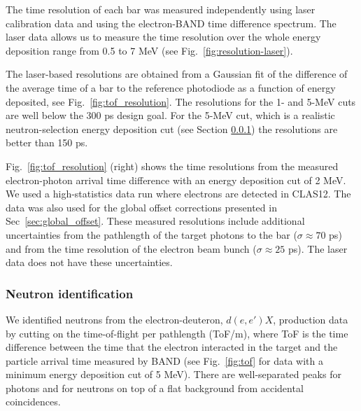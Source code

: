 \documentclass[review,number,sort&compress]{elsarticle}
\begin{document}
The time resolution of each bar was measured
independently using laser calibration data and using the electron-BAND
time difference spectrum. The laser data allows us to measure the time
resolution over the whole energy deposition range from 0.5 to 7 \si{\mega\electronvolt}  (see
Fig.~\ref{fig:resolution-laser}).

The laser-based resolutions are obtained from a Gaussian fit of the difference of
the average time of a bar to the reference photodiode as a function of energy
deposited, see Fig.~\ref{fig:tof_resolution}. The resolutions for the
1- and 5-\si{\mega\electronvolt} cuts are well below the 300 \si{\pico\s} design goal. For the 5-\si{\mega\electronvolt} cut, which
is a realistic neutron-selection energy deposition cut (see Section
\ref{sec:neutronidentification}) the resolutions are better than 150 \si{\pico\s}.

Fig.~\ref{fig:tof_resolution} (right) shows the time resolutions from
the measured electron-photon arrival time difference with an energy deposition cut of 2 \si{\mega\electronvolt}. We used a high-statistics data run where
electrons are detected in CLAS12. The data was also used for the
global offset corrections presented in Sec~\ref{sec:global_offset}.
These measured resolutions include
additional uncertainties from the pathlength of the target photons
to the bar ($\sigma\approx 70$ \si{\pico\s}) and from the time resolution of the electron beam bunch ($\sigma \approx 25$ \si{\pico\s}). The
laser data does not have these uncertainties.


\subsubsection{Neutron identification}
\label{sec:neutronidentification}
We identified neutrons from the electron-deuteron, $d(e,e')X$,
production data by cutting on the
time-of-flight per pathlength (ToF/m), where ToF is the time difference
between the time that the electron
interacted in the target and the particle arrival time measured by
BAND (see Fig.~\ref{fig:tof} for data with a minimum energy deposition
cut of 5 \si{\MeV}). There are well-separated peaks for
photons and for neutrons on top of a flat background from accidental coincidences. 
\end{document}
